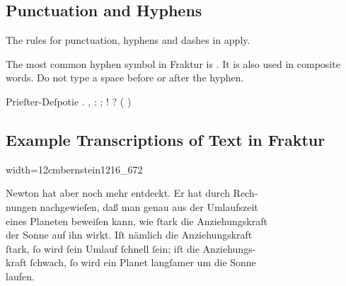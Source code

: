


\tocspace
\subsection{Punctuation and Hyphens}

\begin{mainrule}
The rules for punctuation, hyphens and dashes in  apply.
\end{mainrule}

\begin{clarification}
The most common hyphen symbol in Fraktur is \fraktur{=}. It is also used in composite words. Do not type a space before or after the hyphen.
\end{clarification}


\vspace{3mm}
\begin{example}

\vspace{-3mm}
 \qquad {}
\begin{typeLatin}
Prieſter-Deſpotie      . , : ; ! ? ( )
\end{typeLatin}

\end{example}

\tocspace
\subsection{Example Transcriptions of Text in Fraktur}

\begin{sampleImageSmall}[ 1]{width=12cm}{bernstein1216_672}
\begin{typeLatin}
Newton hat aber noch mehr entdeckt. Er hat durch Rech-  \\
nungen nachgewieſen, daß man genau aus der Umlaufszeit  \\
eines Planeten beweiſen kann, wie ſtark die Anziehungskraft  \\
der Sonne auf ihn wirkt. Iſt nämlich die Anziehungskraft  \\
ſtark, ſo wird ſein Umlauf ſchnell ſein; iſt die Anziehungs-  \\
kraft ſchwach, ſo wird ein Planet langſamer um die Sonne  \\
laufen.
\end{typeLatin}
\end{sampleImageSmall}

